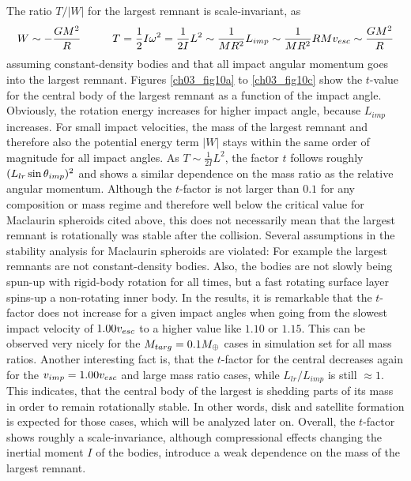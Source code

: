The ratio $T / |W|$ for the largest remnant is scale-invariant, as
\begin{align}
W \sim - \frac{G M^2}{R} \hspace{1.0cm} T = \frac{1}{2} I \omega^2 = \frac{1}{2 I} L^2 \sim \frac{1}{M R^2} L_{imp} \sim \frac{1}{M R^2} R M v_{esc} \sim \frac{G M^2}{R}
\end{align}
assuming constant-density bodies and that all impact angular momentum goes into the largest remnant. Figures \ref{ch03_fig10a} to \ref{ch03_fig10c} show the $t$-value for the central body of the largest remnant as a function of the impact angle. Obviously, the rotation energy increases for higher impact angle, because $L_{imp}$ increases. For small impact velocities, the mass of the largest remnant and therefore also the potential energy term $|W|$ stays within the same order of magnitude for all impact angles. As $T \sim \frac{1}{2I} L^2$, the factor $t$ follows roughly $(L_{lr} \sin{\theta_{imp}} )^2$ and shows a similar dependence on the mass ratio as the relative angular momentum. Although the $t$-factor is not larger than $0.1$ for any composition or mass regime and therefore well below the critical value for Maclaurin spheroids cited above, this does not necessarily mean that the largest remnant is rotationally was stable after the collision. Several assumptions in the stability analysis for Maclaurin spheroids are violated: For example the largest remnants are not constant-density bodies. Also, the bodies are not slowly being spun-up with rigid-body rotation for all times, but a fast rotating surface layer spins-up a non-rotating inner body. 
In the results, it is remarkable that the $t$-factor does not increase for a given impact angles when going from the slowest impact velocity of $1.00 v_{esc}$ to a higher value like $1.10$ or $1.15$. This can be observed very nicely for the $M_{targ} = 0.1 M_{\oplus}$ cases in simulation set \css for all mass ratios. Another interesting fact is, that the $t$-factor for the central decreases again for the $v_{imp} = 1.00 v_{esc}$ and large mass ratio cases, while $L_{lr} / L_{imp}$ is still $\approx 1$. This indicates, that the central body of the largest is shedding parts of its mass in order to remain rotationally stable. In other words, disk and satellite formation is expected for those cases, which will be analyzed later on. 
Overall, the $t$-factor shows roughly a scale-invariance, although compressional effects changing the inertial moment $I$ of the bodies, introduce a weak dependence on the mass of the largest remnant.

